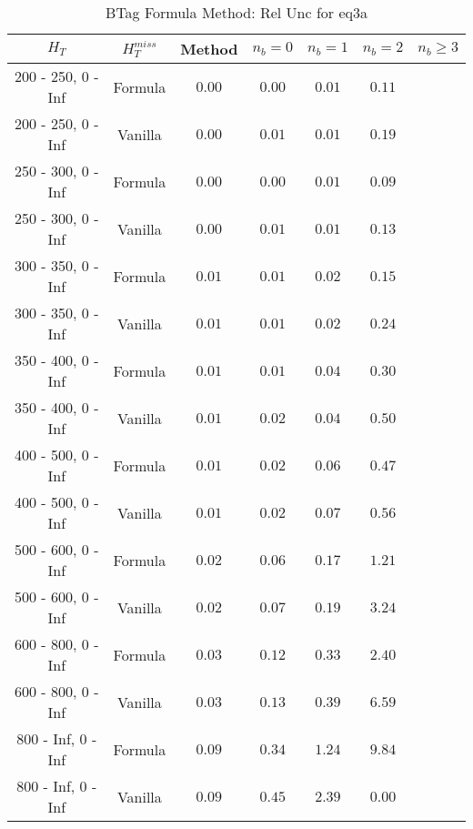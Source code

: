 \begin{longtable}{ | c | c | c | c | c | c | c | }
\caption{BTag Formula Method: Rel Unc for eq3a} \label{tab:eq3a} \\    \hline 
$H_{T}$ & $H_{T}^{miss}$ & Method & $n_{b} = 0$ & $n_{b} = 1$ & $n_{b} = 2$ & $n_{b} \ge 3$ \\ \hline 200 -  250,    0 -  Inf & Formula  & $  0.00 $ & $  0.00 $ & $  0.01 $ & $  0.11 $  \\  
 200 -  250,    0 -  Inf & Vanilla  & $  0.00 $ & $  0.01 $ & $  0.01 $ & $  0.19 $  \\ \hline 
 250 -  300,    0 -  Inf & Formula  & $  0.00 $ & $  0.00 $ & $  0.01 $ & $  0.09 $  \\  
 250 -  300,    0 -  Inf & Vanilla  & $  0.00 $ & $  0.01 $ & $  0.01 $ & $  0.13 $  \\ \hline 
 300 -  350,    0 -  Inf & Formula  & $  0.01 $ & $  0.01 $ & $  0.02 $ & $  0.15 $  \\  
 300 -  350,    0 -  Inf & Vanilla  & $  0.01 $ & $  0.01 $ & $  0.02 $ & $  0.24 $  \\ \hline 
 350 -  400,    0 -  Inf & Formula  & $  0.01 $ & $  0.01 $ & $  0.04 $ & $  0.30 $  \\  
 350 -  400,    0 -  Inf & Vanilla  & $  0.01 $ & $  0.02 $ & $  0.04 $ & $  0.50 $  \\ \hline 
 400 -  500,    0 -  Inf & Formula  & $  0.01 $ & $  0.02 $ & $  0.06 $ & $  0.47 $  \\  
 400 -  500,    0 -  Inf & Vanilla  & $  0.01 $ & $  0.02 $ & $  0.07 $ & $  0.56 $  \\ \hline 
 500 -  600,    0 -  Inf & Formula  & $  0.02 $ & $  0.06 $ & $  0.17 $ & $  1.21 $  \\  
 500 -  600,    0 -  Inf & Vanilla  & $  0.02 $ & $  0.07 $ & $  0.19 $ & $  3.24 $  \\ \hline 
 600 -  800,    0 -  Inf & Formula  & $  0.03 $ & $  0.12 $ & $  0.33 $ & $  2.40 $  \\  
 600 -  800,    0 -  Inf & Vanilla  & $  0.03 $ & $  0.13 $ & $  0.39 $ & $  6.59 $  \\ \hline 
 800 -  Inf,    0 -  Inf & Formula  & $  0.09 $ & $  0.34 $ & $  1.24 $ & $  9.84 $  \\  
 800 -  Inf,    0 -  Inf & Vanilla  & $  0.09 $ & $  0.45 $ & $  2.39 $ & $  0.00 $  \\ \hline 
    \hline 
    \hline 
\end{longtable}

